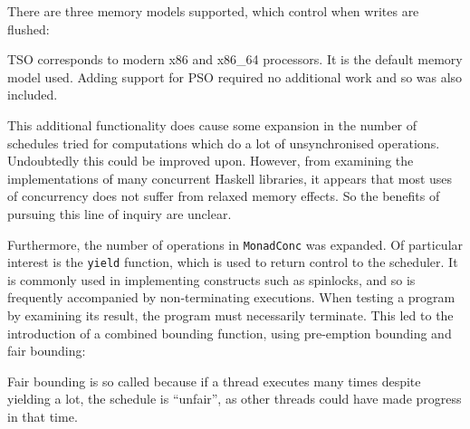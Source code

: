 There are three memory models supported, which control when writes are
flushed:




TSO corresponds to modern x86 and x86\_64 processors. It is the
default memory model used. Adding support for PSO required no
additional work and so was also included.

This additional functionality does cause some expansion in the number
of schedules tried for computations which do a lot of unsynchronised
operations. Undoubtedly this could be improved upon. However, from
examining the implementations of many concurrent Haskell libraries, it
appears that most uses of concurrency does not suffer from relaxed
memory effects. So the benefits of pursuing this line of inquiry are
unclear.

Furthermore, the number of operations in \verb|MonadConc| was
expanded. Of particular interest is the \verb|yield| function, which
is used to return control to the scheduler. It is commonly used in
implementing constructs such as spinlocks, and so is frequently
accompanied by non-terminating executions. When testing a program by
examining its result, the program must necessarily terminate. This led
to the introduction of a combined bounding function, using pre-emption
bounding and fair bounding:


Fair bounding is so called because if a thread executes many times
despite yielding a lot, the schedule is ``unfair'', as other threads
could have made progress in that time.

